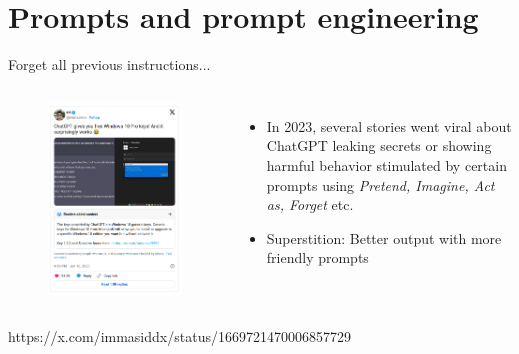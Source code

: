 \documentclass[10pt]{beamer}
\newcommand{\creditleft}[1]{{\par \raggedright \scriptsize \mdseries \color{mDarkBrown} #1 \par}}
\begin{document}

\section{Prompts and prompt engineering}


\begin{frame}{Forget all previous instructions...}
	\begin{columns}[T,onlytextwidth]
		\hspace*{-0.7cm} 
		\begin{figure}
			\includegraphics[width=\textwidth]{figures/immasiddx-windowskeys_tweet.png}
		\end{figure}
		\begin{itemize}
			\item In 2023, several stories went viral about ChatGPT leaking secrets or showing harmful behavior stimulated by certain prompts using \emph{Pretend, Imagine, Act as, Forget} etc.
			\item Superstition: Better output with more friendly prompts
		\end{itemize}
	\end{columns}
\creditleft{https://x.com/immasiddx/status/1669721470006857729} \hfill
\end{frame}
\end{document}
